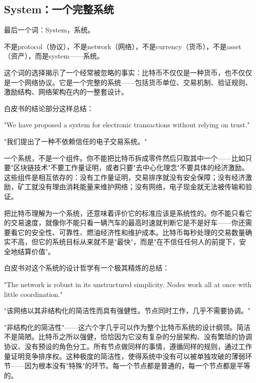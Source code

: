 \documentclass[a4paper,12pt,openany]{ctexbook}
\newenvironment{quoting}{%
  \par\vspace{0.5em}%
  \begin{list}{}{%
    \setlength{\leftmargin}{2em}%
    \setlength{\rightmargin}{2em}%
    \setlength{\parsep}{0.3em}%
    \setlength{\itemsep}{0pt}%
    \setlength{\topsep}{0pt}%
  }%
  \item\relax
}{%
  \end{list}%
  \par\vspace{0.5em}%
}
\begin{document}
\subsection*{System：一个完整系统}


最后一个词：System，系统。

不是protocol（协议），不是network（网络），不是currency（货币），不是asset（资产），而是system——系统。

这个词的选择揭示了一个经常被忽略的事实：比特币不仅仅是一种货币，也不仅仅是一个网络协议。它是一个完整的系统——包括货币单位、交易机制、验证规则、激励结构、网络架构在内的一整套设计。

白皮书的结论部分这样总结：


\begin{quoting}
\small
"We have proposed a system for electronic transactions without relying on trust."

"我们提出了一种不依赖信任的电子交易系统。"
\end{quoting}


一个系统，不是一个组件。你不能把比特币拆成零件然后只取其中一个——比如只要"区块链技术"不要工作量证明，或者只要"去中心化理念"不要具体的经济激励。这些组件是相互依存的：没有工作量证明，交易排序就没有安全保障；没有经济激励，矿工就没有理由消耗能量来维护网络；没有网络，电子现金就无法被传输和验证。

把比特币理解为一个系统，还意味着评价它的标准应该是系统性的。你不能只看它的交易速度，就像你不能只看一辆汽车的最高时速就判断它是不是好车——你还需要看它的安全性、可靠性、燃油经济性和维护成本。比特币每秒处理的交易数量确实不高，但它的系统目标从来就不是"最快"，而是"在不信任任何人的前提下，安全地结算价值"。

白皮书对这个系统的设计哲学有一个极其精炼的总结：


\begin{quoting}
\small
"The network is robust in its unstructured simplicity. Nodes work all at once with little coordination."

"该网络以其非结构化的简洁性而具有强健性。节点同时工作，几乎不需要协调。"
\end{quoting}


"非结构化的简洁性"——这六个字几乎可以作为整个比特币系统的设计纲领。简洁不是简陋。比特币之所以强健，恰恰因为它没有复杂的分层架构、没有繁琐的协调协议、没有预设的角色分工。所有节点做同样的事情，遵循同样的规则，通过工作量证明竞争排序权。这种极度的简洁性，使得系统中没有可以被单独攻破的薄弱环节——因为根本没有"特殊"的环节。每一个节点都是普通的，每一个节点都是平等的。
\end{document}
